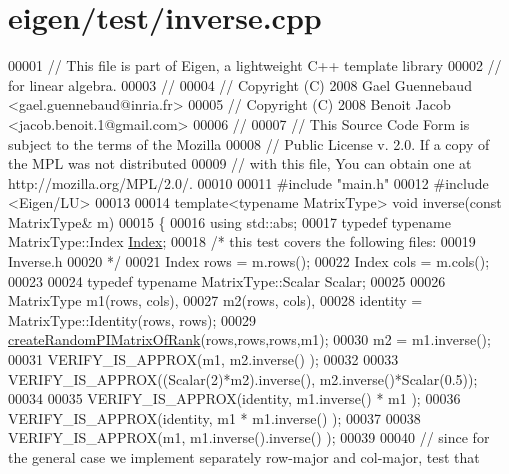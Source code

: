 \hypertarget{eigen_2test_2inverse_8cpp_source}{}\section{eigen/test/inverse.cpp}
\label{eigen_2test_2inverse_8cpp_source}

\begin{DoxyCode}
00001 \textcolor{comment}{// This file is part of Eigen, a lightweight C++ template library}
00002 \textcolor{comment}{// for linear algebra.}
00003 \textcolor{comment}{//}
00004 \textcolor{comment}{// Copyright (C) 2008 Gael Guennebaud <gael.guennebaud@inria.fr>}
00005 \textcolor{comment}{// Copyright (C) 2008 Benoit Jacob <jacob.benoit.1@gmail.com>}
00006 \textcolor{comment}{//}
00007 \textcolor{comment}{// This Source Code Form is subject to the terms of the Mozilla}
00008 \textcolor{comment}{// Public License v. 2.0. If a copy of the MPL was not distributed}
00009 \textcolor{comment}{// with this file, You can obtain one at http://mozilla.org/MPL/2.0/.}
00010 
00011 \textcolor{preprocessor}{#include "main.h"}
00012 \textcolor{preprocessor}{#include <Eigen/LU>}
00013 
00014 \textcolor{keyword}{template}<\textcolor{keyword}{typename} MatrixType> \textcolor{keywordtype}{void} inverse(\textcolor{keyword}{const} MatrixType& m)
00015 \{
00016   \textcolor{keyword}{using} std::abs;
00017   \textcolor{keyword}{typedef} \textcolor{keyword}{typename} MatrixType::Index \hyperlink{namespace_eigen_a62e77e0933482dafde8fe197d9a2cfde}{Index};
00018   \textcolor{comment}{/* this test covers the following files:}
00019 \textcolor{comment}{     Inverse.h}
00020 \textcolor{comment}{  */}
00021   Index rows = m.rows();
00022   Index cols = m.cols();
00023 
00024   \textcolor{keyword}{typedef} \textcolor{keyword}{typename} MatrixType::Scalar Scalar;
00025 
00026   MatrixType m1(rows, cols),
00027              m2(rows, cols),
00028              identity = MatrixType::Identity(rows, rows);
00029   \hyperlink{namespace_eigen_a0d9a7ddcee5c7c8defaba3628455efb2}{createRandomPIMatrixOfRank}(rows,rows,rows,m1);
00030   m2 = m1.inverse();
00031   VERIFY\_IS\_APPROX(m1, m2.inverse() );
00032 
00033   VERIFY\_IS\_APPROX((Scalar(2)*m2).inverse(), m2.inverse()*Scalar(0.5));
00034 
00035   VERIFY\_IS\_APPROX(identity, m1.inverse() * m1 );
00036   VERIFY\_IS\_APPROX(identity, m1 * m1.inverse() );
00037 
00038   VERIFY\_IS\_APPROX(m1, m1.inverse().inverse() );
00039 
00040   \textcolor{comment}{// since for the general case we implement separately row-major and col-major, test that}

\end{DoxyCode}
